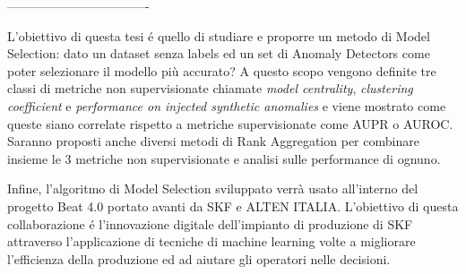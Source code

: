 ----------------------------------

L’obiettivo di questa tesi é quello di studiare e proporre un metodo di Model Selection: dato un dataset senza labels ed un set di Anomaly Detectors come poter selezionare il modello più accurato? A questo scopo vengono definite tre classi di metriche non supervisionate chiamate \textit{model centrality}, \textit{clustering coefficient} e \textit{performance on injected synthetic anomalies} e viene mostrato come queste siano correlate rispetto a metriche supervisionate come AUPR o AUROC. Saranno proposti anche diversi metodi di Rank Aggregation per combinare insieme le 3 metriche non supervisionate e analisi sulle performance di ognuno.

Infine, l'algoritmo di Model Selection sviluppato verrà usato all'interno del progetto Beat 4.0 portato avanti da SKF e ALTEN ITALIA. L'obiettivo di questa collaborazione é l'innovazione digitale dell'impianto di produzione di SKF attraverso l'applicazione di tecniche di machine learning volte a migliorare l'efficienza della produzione ed ad aiutare gli operatori nelle decisioni.